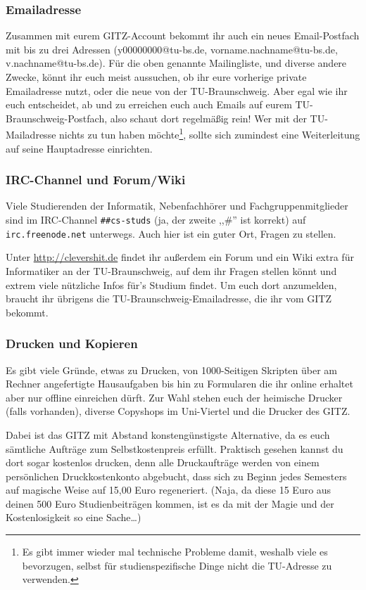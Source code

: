 \begin{multicols}{2}
	\subsubsection{Emailadresse}
		\label{todomailing}
		Zusammen mit eurem GITZ-Account bekommt ihr auch ein neues Email-Postfach mit bis zu drei Adressen (y00000000@tu-bs.de, vorname.nachname@tu-bs.de, v.nachname@tu-bs.de). Für die oben genannte Mailingliste, und diverse andere Zwecke, könnt ihr euch meist aussuchen, ob ihr eure vorherige private Emailadresse nutzt, oder die neue von der TU-Braunschweig. Aber egal wie ihr euch entscheidet, ab und zu erreichen euch auch Emails auf eurem TU-Braunschweig-Postfach, also schaut dort regelmäßig rein! Wer mit der TU-Mailadresse nichts zu tun haben möchte\footnote{Es gibt immer wieder mal technische Probleme damit, weshalb viele es bevorzugen, selbst für studienspezifische Dinge nicht die TU-Adresse zu verwenden.}, sollte sich zumindest eine Weiterleitung auf seine Hauptadresse einrichten.

	\subsubsection{IRC-Channel und Forum/Wiki}
		Viele Studierenden der Informatik, Nebenfachhörer und Fachgruppenmitglieder sind im IRC-Channel \texttt{\#\#cs-studs} (ja, der zweite ,,\#'' ist korrekt) auf \texttt{irc.freenode.net} unterwegs. Auch hier ist ein guter Ort, Fragen zu stellen.

		Unter \url{http://clevershit.de} findet ihr außerdem ein Forum und ein Wiki extra für Informatiker an der TU-Braunschweig, auf dem ihr Fragen stellen könnt und extrem viele nützliche Infos für's Studium findet. Um euch dort anzumelden, braucht ihr übrigens die TU-Braunschweig-Emailadresse, die ihr vom GITZ bekommt.

	\subsubsection{Drucken und Kopieren}
		\label{kopieren}
		Es gibt viele Gründe, etwas zu Drucken, von 1000-Seitigen Skripten über am Rechner angefertigte Hausaufgaben bis hin zu Formularen die ihr online erhaltet aber nur offline einreichen dürft. Zur Wahl stehen euch der heimische Drucker (falls vorhanden), diverse Copyshops im Uni-Viertel und die Drucker des GITZ.

		Dabei ist das GITZ mit Abstand konstengünstigste Alternative, da es euch sämtliche Aufträge zum Selbstkostenpreis erfüllt. Praktisch gesehen kannst du dort sogar kostenlos drucken, denn alle Druckaufträge werden von einem persönlichen Druckkostenkonto abgebucht, dass sich zu Beginn jedes Semesters auf magische Weise auf 15,00 Euro regeneriert. (Naja, da diese 15 Euro aus deinen 500 Euro Studienbeiträgen kommen, ist es da mit der Magie und der Kostenlosigkeit so eine Sache\ldots)


\end{multicols}
